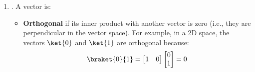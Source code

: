 \begin{enumerate}
\begin{proof}[\textbf{Why Hermitian operators have real eigenvalues}]
\begin{equation*}
            \bra{x}A^\dagger = \overline{\lambda} \bra{x}
        \end{equation*}
        Since $A$ is Hermitian:
        \begin{equation*}
            A^\dagger = A
        \end{equation*}
        Therefore:
        \begin{equation*}
            \bra{x}A = \overline{\lambda} \bra{x}
        \end{equation*}
        Applying this on the left of $\bra{x} A\ket{x}$:
        \begin{equation*}
            \underbrace{\bra{x}A}_{\overline{\lambda} \bra{x}}\ket{x}
            =
            \left(\overline{\lambda}\bra{x}\right)\ket{x}
            =
            \overline{\lambda}\braket{x}{x}
        \end{equation*}
        Combining the two expressions:
        \begin{equation*}
            \lambda \braket{x}{x}
            =
            \overline{\lambda}\braket{x}{x}
        \end{equation*}
        Since:
        \begin{equation*}
            \braket{x}{x} > 0
        \end{equation*}
        Because the inner product of a vector with itself is always positive (unless the vector is the zero vector, which cannot be an eigenvector), we can divide both sides by $\braket{x}{x}$:
        \begin{equation*}
            \lambda = \overline{\lambda}
        \end{equation*}
        Therefore, $\lambda$ is real.
    \end{proof}

    
    \newpage


    \item {}. A vector is:
    \begin{itemize}
        \item \textbf{Orthogonal} if its inner product with another vector is zero (i.e., they are perpendicular in the vector space). For example, in a 2D space, the vectors $\ket{0}$ and $\ket{1}$ are orthogonal because:
        \begin{equation*}
            \braket{0}{1}
            =
            \begin{bmatrix}
                1 & 0
            \end{bmatrix}
            \begin{bmatrix}
                0 \\
                1
            \end{bmatrix}
            = 0
        \end{equation*}


\end{itemize}
\end{enumerate}
